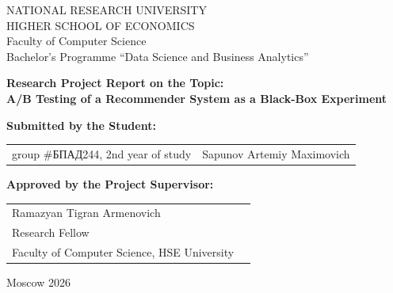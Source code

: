 \begin{titlepage}
\newpage

{
\begin{center}
NATIONAL RESEARCH UNIVERSITY\\
HIGHER SCHOOL OF ECONOMICS
\\
\bigskip
Faculty of Computer Science\\
Bachelor’s Programme “Data Science and Business Analytics”
\end{center}
}

\vspace{2em}
\vspace{4em}

\begin{center}
{\bf Research Project Report on the Topic:}\\
{\bf A/B Testing of a Recommender System as a Black-Box Experiment}\\
\end{center}

\vspace{2em}

{\bf Submitted by the Student: \vspace{2mm}}

{
\begin{tabular}{l@{\hskip 1.5cm}l}
group \#\foreignlanguage{russian}{БПАД}244, 2nd year of study & 
Sapunov Artemiy Maximovich \\
\end{tabular}}


\vspace{1em}
{\bf Approved by the Project Supervisor: \vspace{2mm}}

{
\begin{tabular}{l@{\hskip 1.5cm}l}
Ramazyan Tigran Armenovich\\
Research Fellow\\
Faculty of Computer Science, HSE University 
\end{tabular}}

\vspace{\fill}

\begin{center}
Moscow 2026
\end{center}

\end{titlepage}